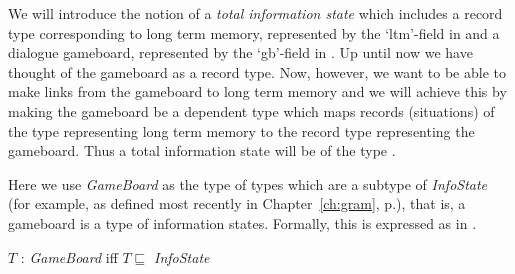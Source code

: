 We will introduce the notion of a \textit{total information state} \citep[\textit{cf.}][]{Larsson2002}
which includes a record type corresponding to long term memory,
represented by the `ltm'-field in \nexteg{} and a dialogue gameboard,
represented by the `gb'-field in \nexteg{}.  Up until now we have
thought of the gameboard as a record type.  Now, however, we want to
be able to make links from the gameboard to long term memory and we
will achieve this by making the gameboard be a dependent type which
maps records (situations) of the type representing long term memory to
the record type representing the gameboard.  Thus a total information state
will be of the type \nexteg{}.
\begin{ex} 
\end{ex} 
Here we use \textit{GameBoard} as the type of types which are a
subtype of \textit{InfoState} (for example, as defined most recently
in Chapter~\ref{ch:gram}, p.\pageref{ex:InfoState-chgram}), that is, a gameboard is a type of
information states.  Formally, this is expressed as in \nexteg{}.
\begin{ex} 
$T$ : \textit{GameBoard} iff $T\sqsubseteq$ \textit{InfoState}
\label{ex:GameBoard}
\end{ex} 


